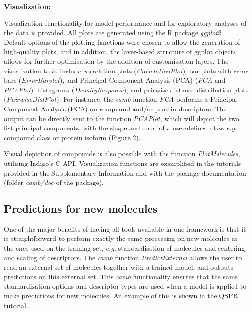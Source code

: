 \documentclass[twoside,a4wide,10pt]{article}
\begin{document}
{\bf Visualization:}

Visualization functionality for model performance and for exploratory analyses of the data is provided. 
All plots are generated using the R package {\it ggplot2} \citep{ggplot2}.
Default options of the plotting functions were chosen to allow the generation of high-quality plots,
and in addition, the layer-based structure of ggplot objects allows for further optimisation
by the addition of customisation layers.  
The visualization tools include correlation plots ({\it CorrelationPlot}),
bar plots with error bars ({\it ErrorBarplot}), and
Principal Component Analysis (PCA) ({\it PCA} and {\it PCAPlot}),
histograms ({\it DensityResponse}),
and pairwise distance distribution plots ({\it PairwiseDistPlot}).
For instance, the {\it camb} function {\it PCA} performs a Principal Component Analysis (PCA) 
on compound and/or protein descriptors.
The output can be directly sent to the function {\it PCAPlot},
which will depict the two fist principal components,
with the shape and color of a user-defined class
{\it e.g.} compound class or protein isoform (Figure 2).

Visual depiction of compounds is also possible with the function {\it PlotMolecules},
utilising Indigo's C API. 
Visualization functions are exemplified in the tutorials provided in the Supplementary Information
and with the package documentation (folder {\it camb/doc} of the package).

\subsection{Predictions for new molecules}
One of the major benefits of having all tools available in one framework is that 
it is straightforward to perform exactly the same processing on new molecules as the ones used on the training set,
{\it e.g.} standardisation of molecules and centering and scaling of descriptors.
The {\it camb} function {\it PredictExternal} allows the user to read an external set of molecules together with a trained model, 
and outputs predictions on this external set. 
This {\it camb} functionality 
ensures that the same standardization options and descriptor types are used when a model is applied to make predictions for new molecules.
An example of this is shown in the QSPR tutorial.


\end{document}
